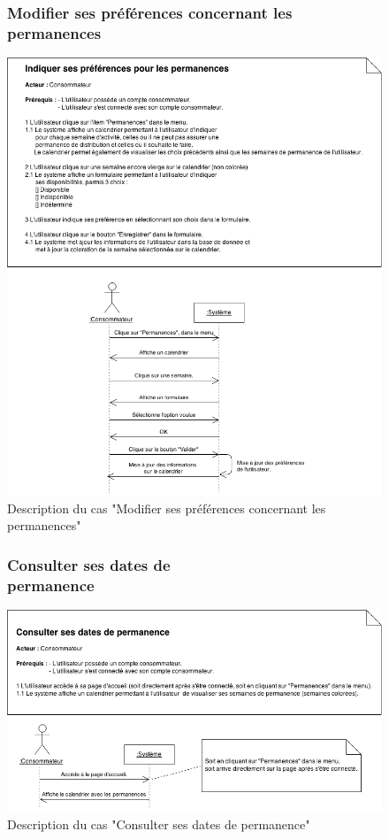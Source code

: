 \documentclass[12pt]{report}
\begin{document}
\begin{figure}[!h]
\centering
\subsubsection{Modifier ses préférences concernant les permanences~~~~~~~~~~~~~~~~~~~~~~~~~~~}
\includegraphics[width=1.\textwidth]{./ressources/desc_UC_preferences_calendrier.png}
\caption{Description du cas "Modifier ses préférences concernant les permanences"}
\end{figure}
\clearpage

\begin{figure}[!h]
\centering
\subsubsection{Consulter ses dates de permanence~~~~~~~~~~~~~~~~~~~~~~~~~~~}
\includegraphics[width=1.\textwidth]{./ressources/desc_UC_consulter_permanences.png}
\caption{Description du cas "Consulter ses dates de permanence"}
\end{figure}
\clearpage
\end{document}
